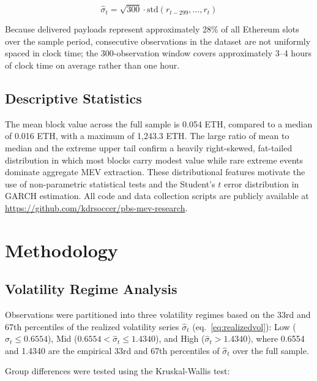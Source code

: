 \documentclass[11pt]{article}
\begin{document}
\begin{equation}
\hat\sigma_t = \sqrt{300} \cdot \text{std}(r_{t-299}, \ldots, r_t)
\label{eq:realizedvol}
\end{equation}

Because delivered payloads represent approximately 28\% of all Ethereum slots
over the sample period, consecutive observations in the dataset are not
uniformly spaced in clock time; the 300-observation window covers approximately
3--4 hours of clock time on average rather than one hour.

\subsection{Descriptive Statistics}

The mean block value across the full sample is 0.054 ETH, compared to a median
of 0.016 ETH, with a maximum of 1,243.3 ETH. The large ratio of mean to median
and the extreme upper tail confirm a heavily right-skewed, fat-tailed
distribution in which most blocks carry modest value while rare extreme events
dominate aggregate MEV extraction. These distributional features motivate the
use of non-parametric statistical tests and the Student's $t$ error distribution
in GARCH estimation. All code and data collection scripts are publicly available
at \url{https://github.com/kdrsoccer/pbs-mev-research}.

\section{Methodology}
\label{sec:method}

\subsection{Volatility Regime Analysis}
\label{sec:method_vol}

Observations were partitioned into three volatility regimes based on the 33rd
and 67th percentiles of the realized volatility series $\hat\sigma_t$
(eq.~\ref{eq:realizedvol}): Low ($\hat\sigma_t \leq 0.6554$), Mid
($0.6554 < \hat\sigma_t \leq 1.4340$), and High ($\hat\sigma_t > 1.4340$),
where 0.6554 and 1.4340 are the empirical 33rd and 67th percentiles of
$\hat\sigma_t$ over the full sample.

Group differences were tested using the Kruskal-Wallis test:
\end{document}
